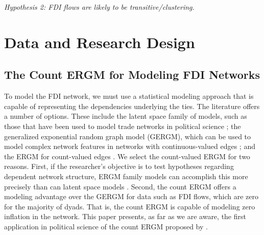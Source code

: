 \documentclass{article}
\begin{document}
\textit{Hypothesis 2: FDI flows are likely to be transitive/clustering.}




\section{Data and Research Design}

\subsection{The Count ERGM for Modeling FDI Networks}

To model the FDI network, we must use a statistical modeling approach that is capable of representing the dependencies underlying the ties. The literature offers a number of options. These include the latent space family of models, such as those that have been used to model trade networks in political science \citep{ward2007persistent,ward2013gravity}; the generalized exponential random graph model (GERGM), which can be used to model complex network features in networks with continuous-valued edges \citep{desmarais2012statistical,wilson2017stochastic}; and the ERGM for count-valued edges \citep{krivitsky2012exponential}. We select the count-valued ERGM for two reasons. First, if the researcher's objective is to test hypotheses regarding dependent network structure, ERGM family models can accomplish this more precisely than can latent space models \citep{cranmer2016navigating,cranmer2016critique,desmarais2017statistical}. Second, the count ERGM offers a modeling advantage over the GERGM for data such as FDI flows, which are zero for the majority of dyads. That is, the count ERGM is capable of modeling zero inflation in the network. This paper presents, as far as we are aware, the first application in political science of the count ERGM proposed by \cite{krivitsky2012exponential}.
\end{document}
